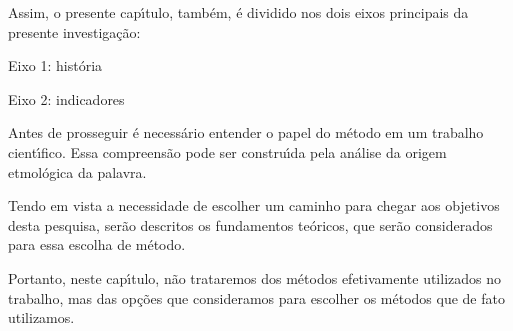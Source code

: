 \documentclass[
12pt,		%
openright,	%
twoside,  %
a4paper,			%
chapter=TITLE,		%
english,			%
french,				%
spanish,			%
brazil				%
]{USPSC-classe/USPSC}
\begin{document}
Assim, o presente cap\'{\i}tulo, tamb\'em, \'e dividido nos dois eixos principais da presente investiga\c{c}\~ao:









\begin{alineas}
\item Eixo 1: hist\'oria
\item Eixo 2: indicadores
\end{alineas}

Antes de prosseguir \'e necess\'ario entender o papel do m\'etodo em um trabalho cient\'{\i}fico. Essa compreens\~ao pode ser constru\'{\i}da pela an\'alise da origem etmol\'ogica da palavra.









\noindent\begin{center}\mbox{\centering{}}\end{center}


Tendo em vista a necessidade de escolher um caminho para chegar  aos objetivos desta pesquisa, ser\~ao descritos os fundamentos te\'oricos, que ser\~ao considerados para essa escolha de m\'etodo.








Portanto, neste cap\'{\i}tulo, n\~ao trataremos dos m\'etodos efetivamente utilizados no trabalho, mas das op\c{c}\~oes que consideramos para escolher os m\'etodos que de fato utilizamos.
\end{document}
